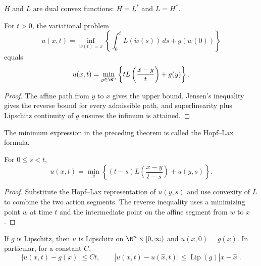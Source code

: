 \begin{remark}
\label{rem:dual-convex-functions}
$H$ and $L$ are dual convex functions: $H=L^*$ and $L=H^*$.
\end{remark}

\begin{theorem}
\label{thm:hopf-lax-formula-derivation}
For $t>0$, the variational problem
\[
u(x,t)=\inf_{w(t)=x}\left\{\int_0^tL(\dot w(s))\,ds+g(w(0))\right\}
\]
equals
\[
u(x,t)=\min_{y\in\R^n}\left\{tL\left(\frac{x-y}{t}\right)+g(y)\right\}.
\]
\end{theorem}

\begin{proof}
\sketch The affine path from $y$ to $x$ gives the upper bound. Jensen's
inequality gives the reverse bound for every admissible path, and
superlinearity plus Lipschitz continuity of $g$ ensures the infimum is
attained.
\end{proof}

\begin{definition}
\label{def:hopf-lax-formula}
The minimum expression in the preceding theorem is called the Hopf--Lax
formula.
\end{definition}

\begin{lemma}
\label{lem:hopf-lax-functional-identity}
For $0\le s<t$,
\[
u(x,t)=\min_y\left\{(t-s)L\left(\frac{x-y}{t-s}\right)+u(y,s)\right\}.
\]
\end{lemma}

\begin{proof}
\sketch Substitute the Hopf--Lax representation of $u(y,s)$ and use
convexity of $L$ to combine the two action segments. The reverse inequality
uses a minimizing point $w$ at time $t$ and the intermediate point on the
affine segment from $w$ to $x$.
\end{proof}

\begin{lemma}
\label{lem:hopf-lax-lipschitz-continuity}
If $g$ is Lipschitz, then $u$ is Lipschitz on $\R^n\times[0,\infty)$ and
$u(x,0)=g(x)$. In particular, for a constant $C$,
\[
|u(x,t)-g(x)|\le Ct,\qquad
|u(x,t)-u(\hat x,t)|\le \operatorname{Lip}(g)|x-\hat x|.
\]
\end{lemma}


